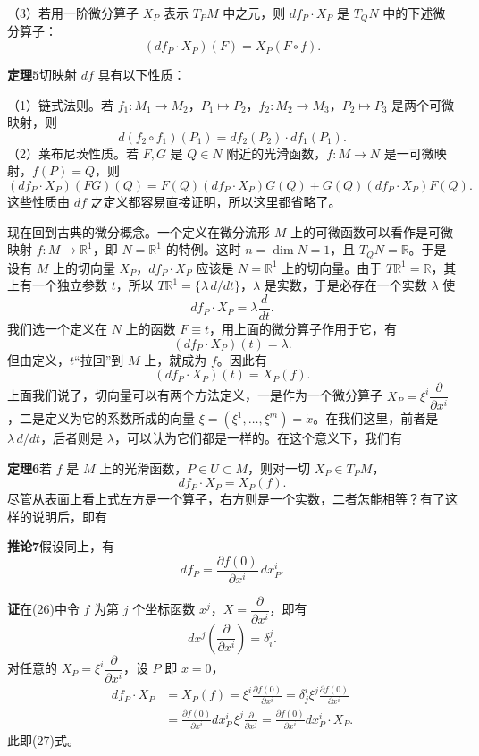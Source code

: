 （3）若用一阶微分算子 $X_P$ 表示 $T_PM$ 中之元，则 $df_P\cdot X_P$ 是 $T_QN$ 中的下述微分算子：
\begin{equation}
 (df_P\cdot X_P)(F)=X_P(F\circ f).
 \tag{25}
\end{equation}

\noindent\textbf{定理5}\quad 切映射 $df$ 具有以下性质：

（1）链式法则。若 $f_1:M_1\to M_2$，$P_1\mapsto P_2$，$f_2:M_2\to M_3$，$P_2\mapsto P_3$ 是两个可微映射，则
\[
 d(f_2\circ f_1)(P_1)=df_2(P_2)\cdot df_1(P_1).
\]
（2）莱布尼茨性质。若 $F,G$ 是 $Q\in N$ 附近的光滑函数，$f:M\to N$ 是一可微映射，$f(P)=Q$，则
\[
 (df_P\cdot X_P)(FG)(Q)
 =F(Q)(df_P\cdot X_P)G(Q)+G(Q)(df_P\cdot X_P)F(Q).
\]
这些性质由 $df$ 之定义都容易直接证明，所以这里都省略了。

现在回到古典的微分概念。一个定义在微分流形 $M$ 上的可微函数可以看作是可微映射 $f:M\to\mathbb R^1$，即 $N=\mathbb R^1$ 的特例。这时 $n=\dim N=1$，且 $T_QN=\mathbb R$。于是设有 $M$ 上的切向量 $X_P$，$df_P\cdot X_P$ 应该是 $N=\mathbb R^1$ 上的切向量。由于 $T\mathbb R^1=\mathbb R$，其上有一个独立参数 $t$，所以 $T\mathbb R^1=\{\lambda\,d/dt\}$，$\lambda$ 是实数，于是必存在一个实数 $\lambda$ 使
\[
 df_P\cdot X_P=\lambda\frac{d}{dt}.
\]
我们选一个定义在 $N$ 上的函数 $F\equiv t$，用上面的微分算子作用于它，有
\[
 (df_P\cdot X_P)(t)=\lambda.
\]
但由定义，$t$“拉回”到 $M$ 上，就成为 $f$。因此有
\[
 (df_P\cdot X_P)(t)=X_P(f).
\]
上面我们说了，切向量可以有两个方法定义，一是作为一个微分算子 $X_P=\xi^i\dfrac{\partial}{\partial x^i}$，二是定义为它的系数所成的向量 $\xi=(\xi^1,\ldots,\xi^m)=\dot x$。在我们这里，前者是 $\lambda\,d/dt$，后者则是 $\lambda$，可以认为它们都是一样的。在这个意义下，我们有

\noindent\textbf{定理6}\quad 若 $f$ 是 $M$ 上的光滑函数，$P\in U\subset M$，则对一切 $X_P\in T_PM$，
\begin{equation}
 df_P\cdot X_P=X_P(f).
 \tag{26}
\end{equation}
尽管从表面上看上式左方是一个算子，右方则是一个实数，二者怎能相等？有了这样的说明后，即有

\noindent\textbf{推论7}\quad 假设同上，有
\begin{equation}
 df_P=\frac{\partial f(0)}{\partial x^i}\,dx_P^i.
 \tag{27}
\end{equation}

\noindent\textbf{证}\quad 在(26)中令 $f$ 为第 $j$ 个坐标函数 $x^j$，$X=\dfrac{\partial}{\partial x^i}$，即有
\begin{equation}
 dx^j\left(\frac{\partial}{\partial x^i}\right)=\delta_i^j.
 \tag{28}
\end{equation}
对任意的 $X_P=\xi^i\dfrac{\partial}{\partial x^i}$，设 $P$ 即 $x=0$，
\[
 \begin{aligned}
 df_P\cdot X_P
 &=X_P(f)=\xi^i\frac{\partial f(0)}{\partial x^i}
 =\delta_j^i\xi^j\frac{\partial f(0)}{\partial x^i}\\
 &=\frac{\partial f(0)}{\partial x^i}dx_P^i\,
   \xi^j\frac{\partial}{\partial x^j}
 =\frac{\partial f(0)}{\partial x^i}dx_P^i\cdot X_P.
 \end{aligned}
\]
此即(27)式。


